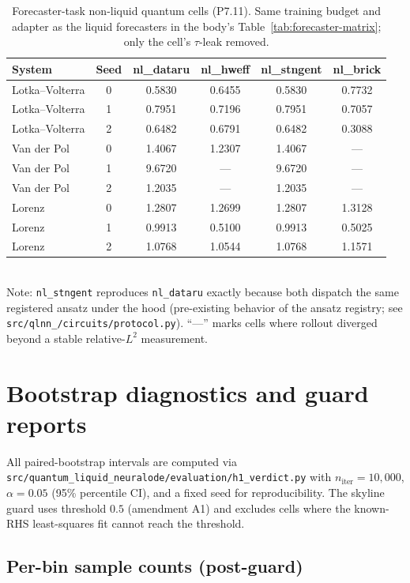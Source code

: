\documentclass[%
  prx,
  amsmath,
  amssymb,
  aps,
  reprint,
  superscriptaddress,
  floatfix,
]{revtex4-2}
\newcommand{\lv}{Lotka--Volterra}
\newcommand{\vdp}{Van der Pol}
\begin{document}
\begin{table}[t]
\centering
\caption{Forecaster-task non-liquid quantum cells (P7.11).
Same training budget and adapter as the liquid forecasters in
the body's Table~\ref{tab:forecaster-matrix}; only the cell's
$\tau$-leak removed.}
\label{sup:tab:forecaster-nonliquid}
\footnotesize
\begin{tabular}{lc|cccc}
\toprule
System & Seed & nl\_dataru & nl\_hweff & nl\_stngent & nl\_brick \\
\midrule
\lv{} & 0 & 0.5830 & 0.6455 & 0.5830 & 0.7732 \\
\lv{} & 1 & 0.7951 & 0.7196 & 0.7951 & 0.7057 \\
\lv{} & 2 & 0.6482 & 0.6791 & 0.6482 & 0.3088 \\
\vdp{} & 0 & 1.4067 & 1.2307 & 1.4067 & --- \\
\vdp{} & 1 & 9.6720 & --- & 9.6720 & --- \\
\vdp{} & 2 & 1.2035 & --- & 1.2035 & --- \\
Lorenz & 0 & 1.2807 & 1.2699 & 1.2807 & 1.3128 \\
Lorenz & 1 & 0.9913 & 0.5100 & 0.9913 & 0.5025 \\
Lorenz & 2 & 1.0768 & 1.0544 & 1.0768 & 1.1571 \\
\bottomrule
\end{tabular}\\[2pt]
\footnotesize Note: \texttt{nl\_stngent} reproduces
\texttt{nl\_dataru} exactly because both dispatch the same
registered ansatz under the hood (pre-existing behavior of the
ansatz registry; see \texttt{src/qlnn\_/circuits/protocol.py}).
``---'' marks cells where rollout diverged beyond a stable
relative-$L^2$ measurement.
\end{table}

\section{Bootstrap diagnostics and guard reports}
\label{sup:bootstrap}

All paired-bootstrap intervals are computed via
\texttt{src/quantum\_liquid\_neuralode/evaluation/h1\_verdict.py}
with $n_\mathrm{iter} = 10{,}000$, $\alpha = 0.05$ (95\% percentile
CI), and a fixed seed for reproducibility. The skyline guard uses
threshold $0.5$ (amendment A1) and excludes cells where the
known-RHS least-squares fit cannot reach the threshold.

\subsection{Per-bin sample counts (post-guard)}
\end{document}
